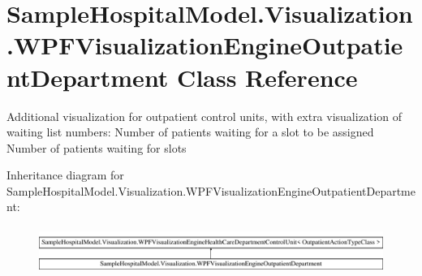 \hypertarget{class_sample_hospital_model_1_1_visualization_1_1_w_p_f_visualization_engine_outpatient_department}{}\section{Sample\+Hospital\+Model.\+Visualization.\+W\+P\+F\+Visualization\+Engine\+Outpatient\+Department Class Reference}
\label{class_sample_hospital_model_1_1_visualization_1_1_w_p_f_visualization_engine_outpatient_department}


Additional visualization for outpatient control units, with extra visualization of waiting list numbers\+: Number of patients waiting for a slot to be assigned Number of patients waiting for slots  


Inheritance diagram for Sample\+Hospital\+Model.\+Visualization.\+W\+P\+F\+Visualization\+Engine\+Outpatient\+Department\+:\begin{figure}[H]
\begin{center}
\leavevmode
\includegraphics[height=1.549101cm]{class_sample_hospital_model_1_1_visualization_1_1_w_p_f_visualization_engine_outpatient_department}
\end{center}
\end{figure}
